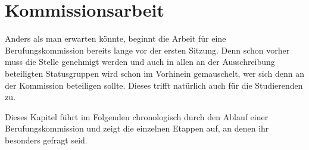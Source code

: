 \chapter{Kommissionsarbeit}\thispagestyle{fancy}
Anders als man erwarten könnte, beginnt die Arbeit für eine Berufungskommission bereits lange vor der ersten Sitzung. Denn schon vorher muss die Stelle genehmigt werden und auch in allen an der Ausschreibung beteiligten Statusgruppen wird schon im Vorhinein gemauschelt, wer sich denn an der Kommission beteiligen sollte. Dieses trifft natürlich auch für die Studierenden zu.

Dieses Kapitel führt im Folgenden chronologisch durch den Ablauf einer Berufungskommission und zeigt die einzelnen Etappen auf, an denen ihr besonders gefragt seid.










